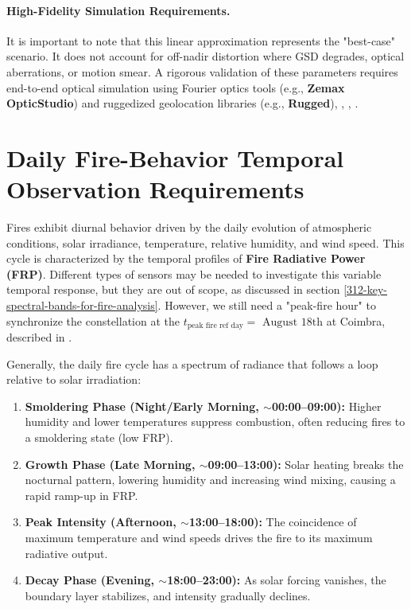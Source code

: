 \paragraph{High-Fidelity Simulation Requirements.}
It is important to note that this linear approximation represents the "best-case" scenario. It does not account for off-nadir distortion where GSD degrades, optical aberrations, or motion smear. A rigorous validation of these parameters requires end-to-end optical simulation using Fourier optics tools (e.g., \textbf{Zemax OpticStudio}) and ruggedized geolocation libraries (e.g., \textbf{Rugged}), \cite{segl_s2etes_2015}, \cite{alici_image_2019}, \cite{_rugged_}. 

\section{Daily Fire-Behavior Temporal Observation Requirements}
\label{sec:_fire_daily_temporal_requirements}

Fires exhibit diurnal behavior driven by the daily evolution of atmospheric conditions, solar irradiance, temperature, relative humidity, and wind speed. This cycle is characterized by the temporal profiles of \textbf{Fire Radiative Power (FRP)}. Different types of sensors may be needed to investigate this variable temporal response, but they are out of scope, as discussed in section \ref{312-key-spectral-bands-for-fire-analysis}. However, we still need a "peak-fire hour" to synchronize the constellation at the $t_{\text{peak fire ref day}} = \text{ August 18th}$ at Coimbra, described in .

Generally, the daily fire cycle has a spectrum of radiance that follows a loop relative to solar irradiation:
\begin{enumerate}
    \item \textbf{Smoldering Phase (Night/Early Morning, $\sim$00:00--09:00):} Higher humidity and lower temperatures suppress combustion, often reducing fires to a smoldering state (low FRP).
    \item \textbf{Growth Phase (Late Morning, $\sim$09:00--13:00):} Solar heating breaks the nocturnal pattern, lowering humidity and increasing wind mixing, causing a rapid ramp-up in FRP.
    \item \textbf{Peak Intensity (Afternoon, $\sim$13:00--18:00):} The coincidence of maximum temperature and wind speeds drives the fire to its maximum radiative output.
    \item \textbf{Decay Phase (Evening, $\sim$18:00--23:00):} As solar forcing vanishes, the boundary layer stabilizes, and intensity gradually declines.
\end{enumerate}


